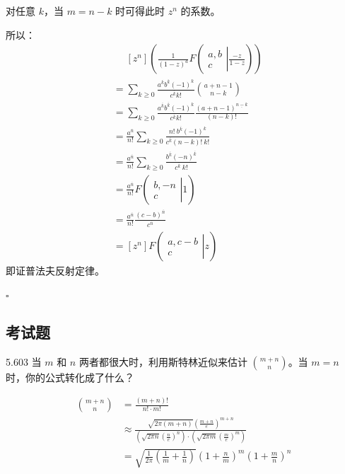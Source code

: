 对任意 \( k \)，当 \( m = n-k \) 时可得此时 \( z^n \) 的系数。

所以：
\begin{align*}
  &\phantom{=}
  [z^{n}](\frac{1}{(1-z)^a} F
    \left( \left.
      \begin{array}{cccc}
        a, b \\
        c
  \end{array} \right|{\frac{-z}{1-z}} \right)) \\
  &= \sum_{k \ge 0} \frac{a^{\overline{k}} b^{\overline{k}} (-1)^k}{c^{\overline{k}} k!} \binom{a+n-1}{n-k} \\
  &= \sum_{k \ge 0} \frac{a^{\overline{k}} b^{\overline{k}} (-1)^k}{c^{\overline{k}} k!} \frac{(a+n-1)^{\underline{n-k}}}{(n-k)!} \\
  &= \frac{a^{\overline{n}}}{n!} \sum_{k \ge 0} \frac{n! \ b^{\overline{k}} (-1)^k}{c^{\overline{k}} (n-k)! \ k!} \\
  &= \frac{a^{\overline{n}}}{n!} \sum_{k \ge 0} \frac{b^{\overline{k}} (-n)^{\overline{k}}}{c^{\overline{k}} \ k!} \\
  &= \frac{a^{\overline{n}}}{n!} F
  \left( \left.
    \begin{array}{cccc}
      b, -n \\
      c
  \end{array} \right|{1} \right) \\
  &= \frac{a^{\overline{n}}}{n!} \frac{(c-b)^{\overline{n}}}{c^{\overline{n}}} \\
  &= [z^n] F
  \left( \left.
    \begin{array}{cccc}
      a, c-b \\
      c
  \end{array} \right|{z} \right)
\end{align*}
即证普法夫反射定律。

\hfill \( \square \)

\subsection{考试题}

\begin{problem}{5.60}{3}
  当 \( m \) 和 \( n \) 两者都很大时，利用斯特林近似来估计 \( \binom{m+n}{n} \)。当 \( m=n \) 时，你的公式转化成了什么？
\end{problem}

\begin{align*}
  \binom{m+n}{n} &= \frac{(m+n)!}{n! \cdot m!} \\[5pt]
  &\approx \frac{\sqrt{2 \pi (m+n)} (\frac{m+n}{e})^{m+n}}{(\sqrt{2 \pi n} (\frac{n}{e})^{n}) \cdot (\sqrt{2 \pi m} (\frac{m}{e})^{m})} \\[5pt]
  &= \sqrt{\frac{1}{2 \pi} ( \frac{1}{m} + \frac{1}{n})} (1 + \frac{n}{m})^m (1 + \frac{m}{n})^n
\end{align*}

